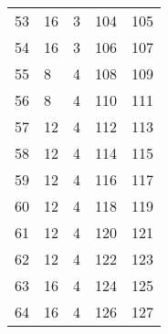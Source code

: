 \documentclass{article}
\begin{document}
\begin{center}
\begin{tabular}{lllrr}
53 & 16 & 3 & 104 & 105 \\
\cline{1-5} \cline{2-5}
54 & 16 & 3 & 106 & 107 \\
\cline{1-5} \cline{2-5}
55 & 8 & 4 & 108 & 109 \\
\cline{1-5} \cline{2-5}
56 & 8 & 4 & 110 & 111 \\
\cline{1-5} \cline{2-5}
57 & 12 & 4 & 112 & 113 \\
\cline{1-5} \cline{2-5}
58 & 12 & 4 & 114 & 115 \\
\cline{1-5} \cline{2-5}
59 & 12 & 4 & 116 & 117 \\
\cline{1-5} \cline{2-5}
60 & 12 & 4 & 118 & 119 \\
\cline{1-5} \cline{2-5}
61 & 12 & 4 & 120 & 121 \\
\cline{1-5} \cline{2-5}
62 & 12 & 4 & 122 & 123 \\
\cline{1-5} \cline{2-5}
63 & 16 & 4 & 124 & 125 \\
\cline{1-5} \cline{2-5}
64 & 16 & 4 & 126 & 127 \\
\cline{1-5} \cline{2-5}
\bottomrule
\end{tabular}

\end{center}
\end{document}
